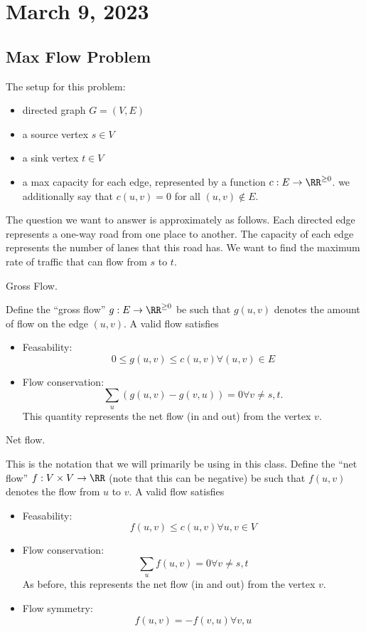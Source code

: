 \section{March 9, 2023}

\subsection{Max Flow Problem}

The setup for this problem: 
\begin{itemize}
    \item directed graph $G = (V,E)$
    \item a source vertex $s\in V$
    \item a sink vertex $t\in V$
    \item a max capacity for each edge, represented by a function $c: E\rightarrow \RR^{\geq 0}$. we additionally say that $c(u,v)=0$ for all $(u,v)\notin E$. 
\end{itemize}

The question we want to answer is approximately as follows. Each directed edge represents a one-way road from one place to another. The capacity of each edge represents the number of lanes that this road has. We want to find the maximum rate of traffic that can flow from $s$ to $t$. 

\begin{definition}

\ac{Gross Flow}.
\end{definition}
Define the ``gross flow'' $g: E\rightarrow \RR^{\geq 0}$ be such that $g(u,v)$ denotes the amount of flow on the edge $(u,v)$. A valid flow satisfies
\begin{itemize}
    \item Feasability: \[0\leq g(u,v)\leq c(u,v)\forall (u,v)\in E\]
    \item Flow conservation: \[\sum_u (g(u,v) - g(v,u)) = 0\forall v\neq s,t.\]
    This quantity represents the net flow (in and out) from the vertex $v$. 
\end{itemize}

\begin{definition}

\ac{Net flow}. 
\end{definition}
This is the notation that we will primarily be using in this class. Define the ``net flow'' $f : V\times V\rightarrow \RR$ (note that this can be negative) be such that $f(u,v)$ denotes the flow from $u$ to $v$. A valid flow satisfies 
\begin{itemize}
    \item Feasability: \[f(u,v)\leq c(u,v)\forall u,v\in V\]
    \item Flow conservation: \[\sum_u f(u,v) = 0\forall v\neq s,t\]
    As before, this represents the net flow (in and out) from the vertex $v$. 
    \item Flow symmetry: \[f(u,v) = -f(v,u)\forall v,u\]
\end{itemize}

